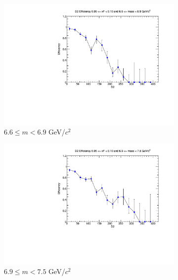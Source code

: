 \documentclass[11pt]{article}
\begin{document}
\begin{figure}[p]
\begin{subfigure}[b]{0.32\textwidth}
        \includegraphics[width=\textwidth]{./kTrackerEfficiencyPlots/D2_Efficiency_xF1_mass8.pdf}
        \caption{$6.6 \leq m < 6.9$ GeV/$c^2$}
    \end{subfigure}\vspace{0.5cm}
    \begin{subfigure}[b]{0.32\textwidth}
        \centering
        \includegraphics[width=\textwidth]{./kTrackerEfficiencyPlots/D2_Efficiency_xF1_mass9.pdf}
        \caption{$6.9 \leq m < 7.5$ GeV/$c^2$}
    \end{subfigure}\hfill
    \begin{subfigure}[b]{0.32\textwidth}
        \centering

\end{subfigure}
\end{figure}
\end{document}

